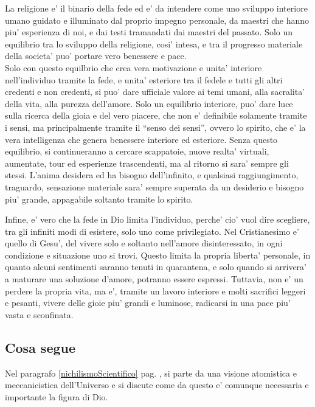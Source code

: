 La religione e' il binario della fede ed e' da intendere come uno sviluppo interiore umano guidato e illuminato dal proprio impegno personale, da maestri che hanno piu' esperienza di noi, e dai testi tramandati dai maestri del passato. Solo un equilibrio tra lo sviluppo della religione, cosi' intesa, e tra il progresso materiale della societa' puo' portare vero benessere e pace.\\
Solo con questo equilbrio che crea vera motivazione e unita' interiore nell'individuo tramite la fede, e unita' esteriore tra il fedele e tutti gli altri credenti e non credenti, si puo' dare ufficiale valore ai temi umani, alla sacralita' della vita, alla purezza dell'amore. 
Solo un equilibrio interiore, puo' dare luce sulla ricerca della gioia e del vero piacere, che non e' definibile solamente tramite i sensi, ma principalmente tramite il ``senso dei sensi'', ovvero lo spirito, che e' la vera intelligenza che genera benessere interiore ed esteriore. Senza questo equilibrio, si continueranno a cercare scappatoie, nuove realta' virtuali, aumentate, tour ed esperienze trascendenti, ma al ritorno si sara' sempre gli stessi. L'anima desidera ed ha bisogno dell'infinito, e qualsiasi raggiungimento, traguardo, sensazione materiale sara' sempre superata da un desiderio e bisogno piu' grande, appagabile soltanto tramite lo spirito.

Infine, e' vero che la fede in Dio limita l'individuo, perche' cio' vuol dire scegliere, tra gli infiniti modi di esistere, solo uno come privilegiato. Nel Cristianesimo e' quello di Gesu', del vivere solo e soltanto nell'amore disinteressato, in ogni condizione e situazione uno si trovi. Questo limita la propria liberta' personale, in quanto alcuni sentimenti saranno tenuti in quarantena, e solo quando si arrivera' a maturare una soluzione d'amore, potranno essere espressi. Tuttavia, non e' un perdere la propria vita, ma e', tramite un lavoro interiore e molti sacrifici leggeri e pesanti, vivere delle gioie piu' grandi e luminose, radicarsi in una pace piu' vasta e sconfinata.


\subsection{Cosa segue}

Nel paragrafo \ref{nichilismoScientifico} pag. \pageref{nichilismoScientifico}, si parte da una visione atomistica e meccanicistica dell'Universo e si discute come da questo e' comunque necessaria e importante la figura di Dio. 

